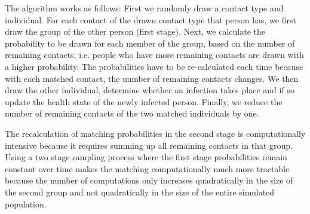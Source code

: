The algorithm works as follows: First we randomly draw a contact type and individual.
For each contact of the drawn contact type that person has, we first draw the group of
the other person (first stage).
Next, we calculate the probability to be drawn for each member of the group, based on
the number of remaining contacts, i.e. people who have more remaining contacts are drawn
with a higher probability. The probabilities have to be re-calculated each time because
with each
matched contact, the number of remaining contacts changes. We then draw the other
individual, determine whether an infection takes place and if so update the health state
of the newly infected person. Finally, we reduce the number of remaining contacts of the
two matched individuals by one. 

The recalculation of matching probabilities in the second stage is computationally
intensive because it requires summing up all remaining contacts in that group. Using a
two stage sampling process where the first stage probabilities remain constant over time
makes the matching computationally much more tractable because the number of
computations only increases quadratically in the size of the second group and not
quadratically in the size of the entire simulated population.
